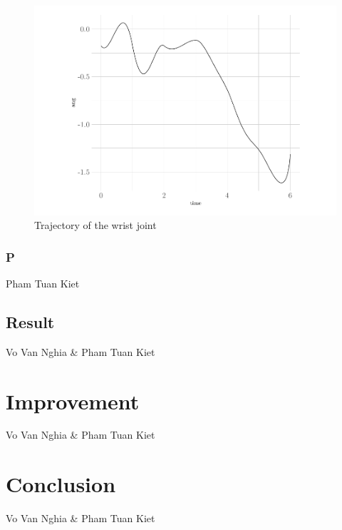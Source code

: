 \documentclass[a4paper, xcolor = usenames,dvipsnames]{article}
\begin{document}
\begin{figure}

{\centering \includegraphics{report_files/figure-latex/traject-wrist-plot-1} 

}

\caption{Trajectory of the wrist joint}\label{fig:traject-wrist-plot}
\end{figure}

\hypertarget{p}{%
\subsubsection{P}\label{p}}

Pham Tuan Kiet

\hypertarget{result}{%
\subsection{Result}\label{result}}

Vo Van Nghia \& Pham Tuan Kiet

\hypertarget{improvement}{%
\section{Improvement}\label{improvement}}

Vo Van Nghia \& Pham Tuan Kiet

\hypertarget{conclusion}{%
\section{Conclusion}\label{conclusion}}

Vo Van Nghia \& Pham Tuan Kiet

\newpage

\printbibliography[title=References]
\end{document}
